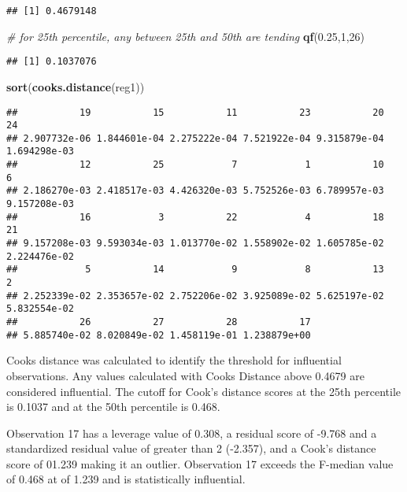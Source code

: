 \documentclass[
]{article}
\newenvironment{Shaded}{\begin{snugshade}}{\end{snugshade}}
\newcommand{\CommentTok}[1]{\textcolor[rgb]{0.56,0.35,0.01}{\textit{#1}}}
\newcommand{\DecValTok}[1]{\textcolor[rgb]{0.00,0.00,0.81}{#1}}
\newcommand{\FloatTok}[1]{\textcolor[rgb]{0.00,0.00,0.81}{#1}}
\newcommand{\FunctionTok}[1]{\textcolor[rgb]{0.13,0.29,0.53}{\textbf{#1}}}
\newcommand{\NormalTok}[1]{#1}
\begin{document}
\begin{verbatim}
## [1] 0.4679148
\end{verbatim}

\begin{Shaded}
\begin{Highlighting}[]
\CommentTok{\# for 25th percentile, any between 25th and 50th are tending}
\FunctionTok{qf}\NormalTok{(}\FloatTok{0.25}\NormalTok{,}\DecValTok{1}\NormalTok{,}\DecValTok{26}\NormalTok{)}
\end{Highlighting}
\end{Shaded}

\begin{verbatim}
## [1] 0.1037076
\end{verbatim}

\begin{Shaded}
\begin{Highlighting}[]
\FunctionTok{sort}\NormalTok{(}\FunctionTok{cooks.distance}\NormalTok{(reg1)) }
\end{Highlighting}
\end{Shaded}

\begin{verbatim}
##           19           15           11           23           20           24 
## 2.907732e-06 1.844601e-04 2.275222e-04 7.521922e-04 9.315879e-04 1.694298e-03 
##           12           25            7            1           10            6 
## 2.186270e-03 2.418517e-03 4.426320e-03 5.752526e-03 6.789957e-03 9.157208e-03 
##           16            3           22            4           18           21 
## 9.157208e-03 9.593034e-03 1.013770e-02 1.558902e-02 1.605785e-02 2.224476e-02 
##            5           14            9            8           13            2 
## 2.252339e-02 2.353657e-02 2.752206e-02 3.925089e-02 5.625197e-02 5.832554e-02 
##           26           27           28           17 
## 5.885740e-02 8.020849e-02 1.458119e-01 1.238879e+00
\end{verbatim}

Cooks distance was calculated to identify the threshold for influential
observations. Any values calculated with Cooks Distance above 0.4679 are
considered influential. The cutoff for Cook's distance scores at the
25th percentile is 0.1037 and at the 50th percentile is 0.468.

Observation 17 has a leverage value of 0.308, a residual score of -9.768
and a standardized residual value of greater than 2 (-2.357), and a
Cook's distance score of 01.239 making it an outlier. Observation 17
exceeds the F-median value of 0.468 at of 1.239 and is statistically
influential.
\end{document}

